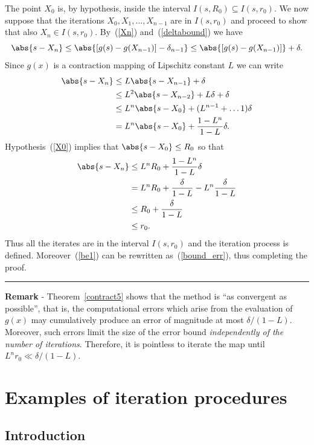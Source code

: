 The point $X_0$ is, by hypothesis, inside the interval $I(s,R_0)
\subseteq I(s,r_0)$.  We now suppose that the iterations $X_0, X_1,
\ldots, X_{n-1}$ are in $I(s,r_0)$ and proceed to show that also $X_n
\in I(s,r_0)$.  By~(\ref{Xn}) and~(\ref{deltabound}) we have
%
\begin{equation*}
  \abs{ s - X_n } \le
    \abs{ [g(s) - g(X_{n-1}) ] - \delta_{n-1}  } \le
  \abs{ [g(s) - g(X_{n-1}) ]  } + \delta .
\end{equation*}
%
Since $g(x)$ is a contraction mapping of Lipschitz constant $L$  we
can write
%
\begin{align*}
  \abs{ s - X_n } & \le L \abs{ s - X_{n-1} } + \delta \\
  & \le L^2 \abs{ s - X_{n-2} } + L \delta + \delta \\
  & \le L^n \abs{ s - X_0} + ( L^{n-1} + \ldots 1 ) \delta \\
  & =  L^n \abs{ s - X_0} + \frac{1-L^n}{1-L} \delta .
\end{align*}
%
Hypothesis~(\ref{X0}) implies that $\abs{s - X_0} \le R_0$ so that
%
\begin{align}
  \abs{ s - X_n } & \le L^n R_0 + \frac{1-L^n}{1-L} \delta  \label{be1} \\
  & = L^n R_0 + \frac{\delta}{1-L} - L^n \frac{\delta}{1-L} \nonumber \\
  & \le R_0  + \frac{\delta}{1-L} \nonumber \\
  & \le r_0. \nonumber
\end{align}
Thus all the iterates are in the interval $I(s,r_0)$ and the iteration
process is defined.   Moreover~(\ref{be1}) can be rewritten
as~(\ref{bound_err}), thus completing the proof. \hfill \rule{3mm}{3mm}

\smallskip

\noindent
\textbf{Remark} - Theorem~\ref{contract5} shows that the method is
``as convergent as possible'', that is, the computational errors which
arise from the evaluation of $g(x)$ may cumulatively produce an error
of magnitude at most $\delta/(1-L)$.  Moreover, such errors limit the
size of the error bound \textit{independently of the number of
iterations}.  Therefore, it is pointless to iterate the map until $L^n
r_0 \ll \delta/(1-L)$.

\section{Examples of iteration procedures}

\subsection{Introduction}

